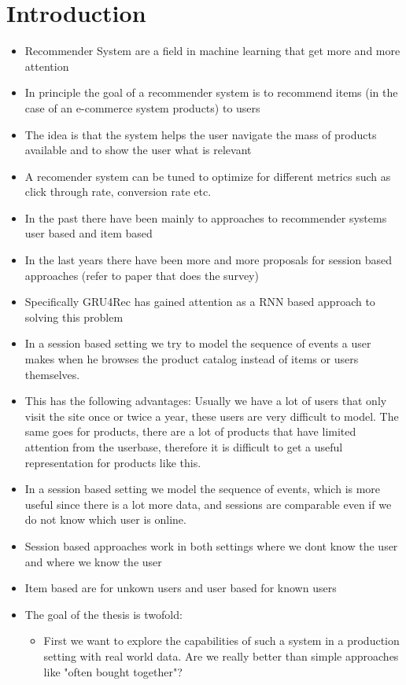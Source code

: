 \chapter{Introduction}

\begin{itemize}
\item Recommender System are a field in machine learning that get more and more attention
\item In principle the goal of a recommender system is to recommend items (in the case of an e-commerce system products) to users
\item The idea is that the system helps the user navigate the mass of products available and to show the user what is relevant
\item A recomender system can be tuned to optimize for different metrics such as click through rate, conversion rate etc.
\item In the past there have been mainly to approaches to recommender systems user based and item based
\item In the last years there have been more and more proposals for session based approaches (refer to paper that does the survey)
\item Specifically GRU4Rec has gained attention as a RNN based approach to solving this problem
\item In a session based setting we try to model the sequence of events a user makes when he browses the product catalog instead of items or users themselves.
\item This has the following advantages: Usually we have a lot of users that only visit the site once or twice a year, these users are very difficult to model. The same goes for products, there are a lot of products that have limited attention from the userbase, therefore it is difficult to get a useful representation for products like this. 
\item In a session based setting we model the sequence of events, which is more useful since there is a lot more data, and sessions are comparable even if we do not know which user is online.
\item Session based approaches work in both settings where we dont know the user and where we know the user
\item Item based are for unkown users and user based for known users
\item The goal of the thesis is twofold: 
\begin{itemize}
    \item First we want to explore the capabilities of such a system in a production setting with real world data. Are we really better than simple approaches like "often bought together"? 

\end{itemize}
\end{itemize}
